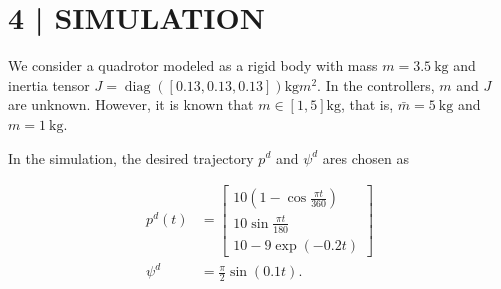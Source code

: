 \documentclass[10pt]{article}
\begin{document}
\section{4 | SIMULATION}
We consider a quadrotor modeled as a rigid body with mass $m=3.5 \mathrm{~kg}$ and inertia tensor $J=\operatorname{diag}([0.13,0.13,0.13]) \mathrm{kg} m^{2}$. In the controllers, $m$ and $J$ are unknown. However, it is known that $m \in[1,5] \mathrm{kg}$, that is, $\bar{m}=5 \mathrm{~kg}$ and $m=1 \mathrm{~kg}$.

In the simulation, the desired trajectory $p^{d}$ and $\psi^{d}$ ares chosen as

$$
\begin{aligned}
p^{d}(t) & =\left[\begin{array}{c}
10\left(1-\cos \frac{\pi t}{360}\right) \\
10 \sin \frac{\pi t}{180} \\
10-9 \exp (-0.2 t)
\end{array}\right] \\
\psi^{d} & =\frac{\pi}{2} \sin (0.1 t) .
\end{aligned}
$$
\end{document}
